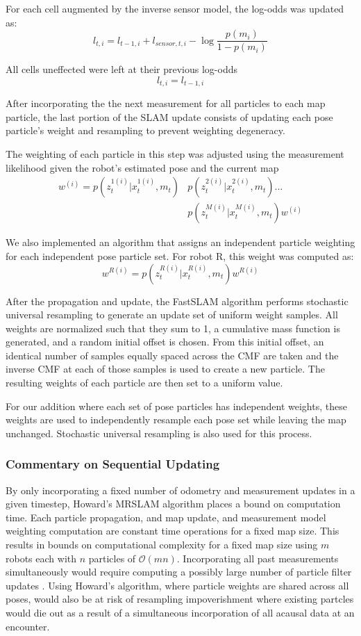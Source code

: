For each cell augmented by the inverse sensor model, the log-odds was updated as:
$$l_{t,i}=l_{t-1,i}+l_{sensor,t,i}-\log\frac{p(m_i)}{1-p(m_i)}$$

All cells uneffected were left at their previous log-odds
$$l_{t,i}=l_{t-1,i}$$

After incorporating the the next measurement for all particles to each map particle, the last portion of the SLAM update consists of updating each pose particle’s weight and resampling to prevent weighting degeneracy.

The weighting of each particle in this step was adjusted using the measurement likelihood given the robot's estimated pose and the current map 
\begin{align}
w^{(i)}=p(z_t^{1(i)}|x_t^{1(i)},m_t)&p(z_t^{2(i)}|x_t^{2(i)},m_t)...\\
&p(z_t^{M(i)}|x_t^{M(i)},m_t)w^{(i)}
\end{align}

We also implemented an algorithm that assigns an independent particle weighting for each independent pose particle set. For robot R, this weight was computed as:
$$w^{R(i)}=p(z_t^{R(i)}|x_t^{R(i)},m_t)w^{R(i)}$$

After the propagation and update, the FastSLAM algorithm performs stochastic universal resampling to generate an update set of uniform weight samples. All weights are normalized such that they sum to 1, a cumulative mass function is generated, and a random initial offset is chosen. From this initial offset, an identical number of samples equally spaced across the CMF are taken and the inverse CMF at each of those samples is used to create a new particle. The resulting weights of each particle are then set to a uniform value. 

For our addition where each set of pose particles has independent weights, these weights are used to independently resample each pose set while leaving the map unchanged. Stochastic universal resampling is also used for this process.
\vspace{0.1in}
\subsubsection{Commentary on Sequential Updating}
By only incorporating a fixed number of odometry and measurement updates in a given timestep, Howard's MRSLAM algorithm places a bound on computation time\cite{howard2006multi}. Each particle propagation, and map update, and measurement model weighting computation are constant time operations for a fixed map size. This results in bounds on computational complexity for a fixed map size using $m$ robots each with $n$ particles of $\mathcal{O}(mn)$. Incorporating all past measurements simultaneously would require computing a possibly large number of particle filter updates \cite{howard2006multi}. Using Howard's algorithm, where particle weights are shared across all poses, would also be at risk of resampling impoverishment where existing partcles would die out as a result of a simultaneous incorporation of all acausal data at an encounter.
